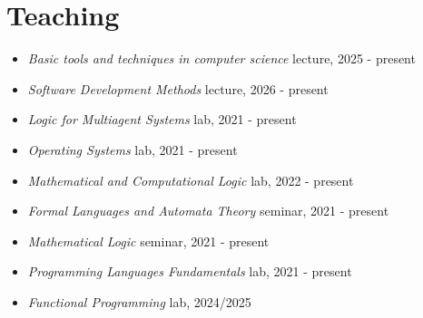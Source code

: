 \documentclass[letterpaper,11pt,oneside]{article}
\begin{document}



\noindent
\section{Teaching}
\normalsize
\begin{itemize}
    \item \textit{Basic tools and techniques in computer science} lecture, 2025 - present 
    \item \textit{Software Development Methods} lecture, 2026 - present
    \item \textit{Logic for Multiagent Systems} lab, 2021 - present 
    \item \textit{Operating Systems} lab, 2021 - present 
    \item \textit{Mathematical and Computational Logic} lab, 2022 - present 
    \item \textit{Formal Languages and Automata Theory} seminar, 2021 - present 
    \item \textit{Mathematical Logic} seminar, 2021 - present 
    \item \textit{Programming Languages Fundamentals} lab, 2021 - present 
    \item \textit{Functional Programming} lab, 2024/2025
\end{itemize}
\mbox{}
\end{document}
